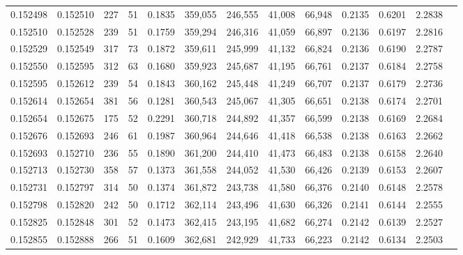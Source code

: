 \begin{tabular}{rrrrrrrrrrrrr}
0.152498 & 0.152510 &   227 &  51 &                                     0.1835 & 359,055 & 246,555 &  41,008 &  66,948 & 0.2135 & 0.6201 & 2.2838 \\
0.152510 & 0.152528 &   239 &  51 &                                     0.1759 & 359,294 & 246,316 &  41,059 &  66,897 & 0.2136 & 0.6197 & 2.2816 \\
0.152529 & 0.152549 &   317 &  73 &                                     0.1872 & 359,611 & 245,999 &  41,132 &  66,824 & 0.2136 & 0.6190 & 2.2787 \\
0.152550 & 0.152595 &   312 &  63 &                                     0.1680 & 359,923 & 245,687 &  41,195 &  66,761 & 0.2137 & 0.6184 & 2.2758 \\
0.152595 & 0.152612 &   239 &  54 &                                     0.1843 & 360,162 & 245,448 &  41,249 &  66,707 & 0.2137 & 0.6179 & 2.2736 \\
0.152614 & 0.152654 &   381 &  56 &                                     0.1281 & 360,543 & 245,067 &  41,305 &  66,651 & 0.2138 & 0.6174 & 2.2701 \\
0.152654 & 0.152675 &   175 &  52 &                                     0.2291 & 360,718 & 244,892 &  41,357 &  66,599 & 0.2138 & 0.6169 & 2.2684 \\
0.152676 & 0.152693 &   246 &  61 &                                     0.1987 & 360,964 & 244,646 &  41,418 &  66,538 & 0.2138 & 0.6163 & 2.2662 \\
0.152693 & 0.152710 &   236 &  55 &                                     0.1890 & 361,200 & 244,410 &  41,473 &  66,483 & 0.2138 & 0.6158 & 2.2640 \\
0.152713 & 0.152730 &   358 &  57 &                                     0.1373 & 361,558 & 244,052 &  41,530 &  66,426 & 0.2139 & 0.6153 & 2.2607 \\
0.152731 & 0.152797 &   314 &  50 &                                     0.1374 & 361,872 & 243,738 &  41,580 &  66,376 & 0.2140 & 0.6148 & 2.2578 \\
0.152798 & 0.152820 &   242 &  50 &                                     0.1712 & 362,114 & 243,496 &  41,630 &  66,326 & 0.2141 & 0.6144 & 2.2555 \\
0.152825 & 0.152848 &   301 &  52 &                                     0.1473 & 362,415 & 243,195 &  41,682 &  66,274 & 0.2142 & 0.6139 & 2.2527 \\
0.152855 & 0.152888 &   266 &  51 &                                     0.1609 & 362,681 & 242,929 &  41,733 &  66,223 & 0.2142 & 0.6134 & 2.2503 \\

\end{tabular}
